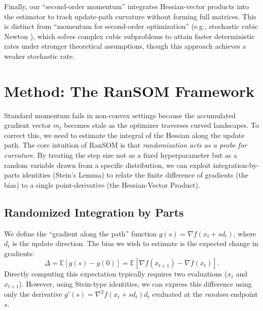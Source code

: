 \documentclass{article}
\theoremstyle{plain}
\theoremstyle{definition}
\theoremstyle{remark}
\begin{document}
Finally, our ``second-order momentum'' integrates Hessian-vector products into the estimator to track update-path curvature without forming full matrices. This is distinct from ``momentum for second-order optimization'' (e.g., stochastic cubic Newton \cite{chayti2024improving}), which solves complex cubic subproblems to attain faster deterministic rates under stronger theoretical assumptions, though this approach achieves a weaker stochastic rate.

\section{Method: The RanSOM Framework}
\label{sec:method}

Standard momentum fails in non-convex settings because the accumulated gradient vector $m_t$ becomes stale as the optimizer traverses curved landscapes. To correct this, we need to estimate the integral of the Hessian along the update path.
The core intuition of RanSOM is that \textit{randomization acts as a probe for curvature}. By treating the step size not as a fixed hyperparameter but as a random variable drawn from a specific distribution, we can exploit integration-by-parts identities (Stein's Lemma) to relate the finite difference of gradients (the bias) to a single point-derivative (the Hessian-Vector Product).

\subsection{Randomized Integration by Parts}
We define the ``gradient along the path'' function $g(s) = \nabla f(x_t + s d_t)$, where $d_t$ is the update direction. The bias we wish to estimate is the expected change in gradients:
$$ \Delta = \mathbb{E}[g(s) - g(0)] = \mathbb{E}[\nabla f(x_{t+1}) - \nabla f(x_t)]. $$
Directly computing this expectation typically requires two evaluations ($x_t$ and $x_{t+1}$). However, using Stein-type identities, we can express this difference using only the derivative $g'(s) = \nabla^2 f(x_t + s d_t) d_t$ evaluated at the \textit{random} endpoint $s$.
\end{document}
